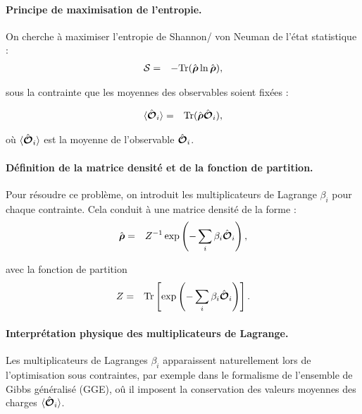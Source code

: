 \paragraph{Principe de maximisation de l'entropie.}
On cherche à maximiser l'entropie de Shannon/ von Neuman de l’état statistique :
\begin{eqnarray}
	\mathcal{S} & = & -\mathrm{Tr} ( \hat{\bm{\rho}} \ln \hat{\bm{\rho}} ) , 	
\end{eqnarray}

sous la contrainte que les moyennes des observables soient fixées :

\begin{eqnarray}
	\langle \hat{\bm{\mathcal{O}}}_i \rangle & = & 	\mathrm{Tr} ( \hat{\bm{\rho}} \hat{\bm{\mathcal{O}}}_i ) ,
\end{eqnarray}

où $\langle \hat{\bm{\mathcal{O}}}_i \rangle$ est la moyenne de l'observable $\hat{\bm{\mathcal{O}}}_i$.

\paragraph{Définition de la matrice densité et de la fonction de partition.}
Pour résoudre ce problème, on introduit les multiplicateurs de Lagrange $\beta_i$ pour chaque contrainte. Cela conduit à une matrice densité de la forme : 
\begin{eqnarray}
	 \hat{\bm{\rho}} &= & Z^{-1} \exp \left ( - \sum_i \beta_i \hat{\bm{\mathcal{O}}}_i \right ) , 		
\end{eqnarray}

avec la fonction de partition 
\begin{eqnarray}
	Z & = & \mathrm{Tr} \left [ \exp \left ( - \sum_i \beta_i \hat{\bm{\mathcal{O}}}_i \right ) \right ]. 	
\end{eqnarray}
 \paragraph{Interprétation physique des multiplicateurs de Lagrange.}
Les multiplicateurs de Lagranges $\beta_i$ apparaissent naturellement lors de l'optimisation sous contraintes, par exemple dans le formalisme de l'ensemble de Gibbs généralisé (GGE), oû il imposent la conservation des valeurs moyennes des charges $\langle \hat{\bm{\mathcal{O}}}_i \rangle $.


